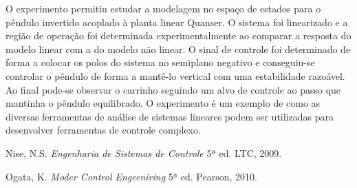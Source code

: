 \documentclass[journal]{IEEEtran}
\begin{document}
O experimento permitiu estudar a modelagem no espaço de estados
para o pêndulo invertido acoplado à planta linear Quanser. O sistema
foi linearizado e a região de operação foi determinada 
experimentalmente ao comparar a resposta do modelo linear com a do 
modelo 
não linear. O sinal de controle foi determinado de forma a colocar
os polos do sistema no semiplano negativo e conseguiu-se controlar
o pêndulo de forma a mantê-lo vertical com uma estabilidade 
razoável. Ao final pode-se observar o carrinho seguindo um alvo
de controle ao passo que mantinha o pêndulo equilibrado. O experimento
é um exemplo de como as diversas ferramentas de análise de sistemas
lineares podem ser utilizadas para desenvolver ferramentas de controle
complexo.
\begin{thebibliography}{9}    
      Nise, N.S.
      \emph{Engenharia de Sistemas de Controle}
     5ª ed.
    LTC, 2009.

      Ogata, K.
      \emph{Moder Control Engeeniring}
     5ª ed.
    Pearson, 2010.
   
\end{thebibliography}
\end{document}
